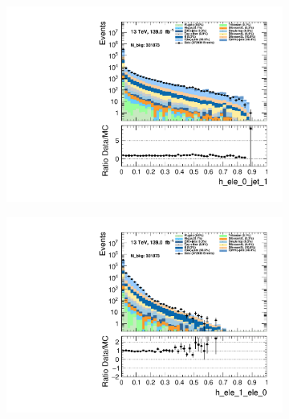 \begin{figure}
    \centering
    \begin{subfigure}{.49\textwidth}
        \includegraphics[width=\textwidth]{Figures/MC_Data_comp/h_ele_0_jet_1.pdf}
        \caption{}
        \label{fig:et}
    \end{subfigure}
    \hfill
    \begin{subfigure}{.49\textwidth}
        \includegraphics[width=\textwidth]{Figures/MC_Data_comp/h_ele_1_ele_0.pdf}
        \caption{ }
        \label{fig:flcp}
    \end{subfigure}
    \hfill 
    \begin{subfigure}{.49\textwidth}

\end{subfigure}
\end{figure}
